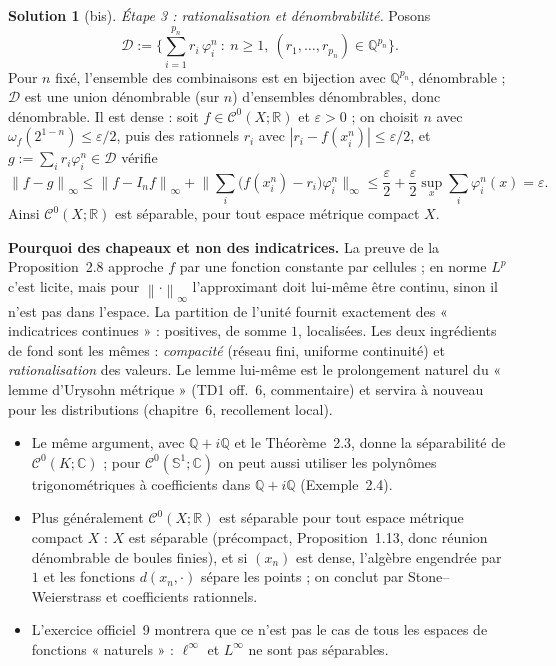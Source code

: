 \documentclass[11pt,a4paper]{article}
\newcommand{\R}{\mathbb{R}}
\newcommand{\Q}{\mathbb{Q}}
\newcommand{\C}{\mathbb{C}}
\newcommand{\Sun}{\mathbb{S}^1}
\newcommand{\norm}[1]{\left\|#1\right\|}
\newcommand{\Cz}{\mathcal{C}^0}
\theoremstyle{definition}
\newtheorem*{solution}{Solution}
\begin{document}
\begin{solution}[bis]
\emph{Étape 3 : rationalisation et dénombrabilité.} Posons
\[
\mathcal D:=\Big\{\sum_{i=1}^{p_n}r_i\,\varphi^n_i\ :\ n\ge1,\ (r_1,\dots,r_{p_n})\in\Q^{p_n}\Big\}.
\]
Pour $n$ fixé, l'ensemble des combinaisons est en bijection avec $\Q^{p_n}$, dénombrable ; $\mathcal D$ est une union dénombrable (sur $n$) d'ensembles dénombrables, donc dénombrable. Il est dense : soit $f\in\Cz(X;\R)$ et $\varepsilon>0$ ; on choisit $n$ avec $\omega_f(2^{1-n})\le\varepsilon/2$, puis des rationnels $r_i$ avec $|r_i-f(x^n_i)|\le\varepsilon/2$, et $g:=\sum_ir_i\varphi^n_i\in\mathcal D$ vérifie
\[
\norm{f-g}_\infty\le\norm{f-I_nf}_\infty+\Big\|\sum_i\big(f(x^n_i)-r_i\big)\varphi^n_i\Big\|_\infty\le\frac\varepsilon2+\frac\varepsilon2\sup_x\sum_i\varphi^n_i(x)=\varepsilon .
\]
Ainsi $\Cz(X;\R)$ est séparable, pour tout espace métrique compact $X$.
\end{solution}

\begin{pointcle}
\textbf{Pourquoi des chapeaux et non des indicatrices.} La preuve de la Proposition~2.8 approche $f$ par une fonction constante par cellules ; en norme $L^p$ c'est licite, mais pour $\norm\cdot_\infty$ l'approximant doit lui-même être continu, sinon il n'est pas dans l'espace. La partition de l'unité fournit exactement des « indicatrices continues » : positives, de somme $1$, localisées. Les deux ingrédients de fond sont les mêmes : \emph{compacité} (réseau fini, uniforme continuité) et \emph{rationalisation} des valeurs. Le lemme lui-même est le prolongement naturel du « lemme d'Urysohn métrique » (TD1 off.~6, commentaire) et servira à nouveau pour les distributions (chapitre~6, recollement local).
\end{pointcle}

\begin{commentaire}
\begin{itemize}
  \item Le même argument, avec $\Q+i\Q$ et le Théorème~2.3, donne la séparabilité de $\Cz(K;\C)$ ; pour $\Cz(\Sun;\C)$ on peut aussi utiliser les polynômes trigonométriques à coefficients dans $\Q+i\Q$ (Exemple~2.4).
  \item Plus généralement $\Cz(X;\R)$ est séparable pour tout espace métrique compact $X$ : $X$ est séparable (précompact, Proposition~1.13, donc réunion dénombrable de boules finies), et si $(x_n)$ est dense, l'algèbre engendrée par $1$ et les fonctions $d(x_n,\cdot)$ sépare les points ; on conclut par Stone--Weierstrass et coefficients rationnels.
  \item L'exercice officiel~9 montrera que ce n'est pas le cas de tous les espaces de fonctions « naturels » : $\ell^\infty$ et $L^\infty$ ne sont pas séparables.
\end{itemize}
\end{commentaire}
\end{document}
